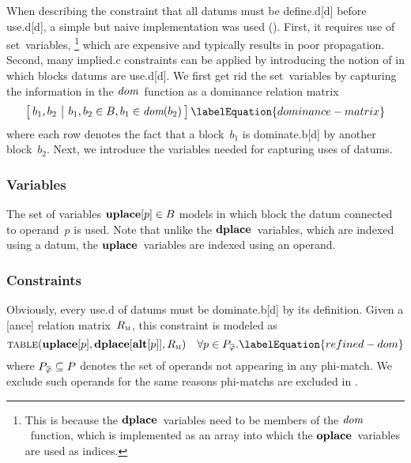 When describing the \gls{constraint} that all \glspl{datum} must be
\gls{define.d}[d] before \gls{use.d}[d], a simple but naive implementation was
used ().
%
First, it requires use of set~\glspl{variable},\!%
%
\footnote{%
  This is because the $\mVar{dplace}$~\glspl{variable} need to be members of the
  $\operatorname{\textit{dom}}$~\gls{function}, which is implemented as an array into which the
  $\mVar{oplace}$~\glspl{variable} are used as indices.%
}
%
which are expensive and typically results in poor \gls{propagation}.
%
Second, many \gls{implied.c} \glspl{constraint} can be applied by introducing
the notion of in which \glspl{block} \glspl{datum} are \gls{use.d}[d].
%
We first get rid the set~\glspl{variable} by capturing the information in the
$\operatorname{\textit{dom}}$~\gls{function} as a dominance relation matrix
%
\begin{equation}
  \begin{bmatrix}
    \begin{array}{@{\:}c|c@{\:}}
        b_1, b_2
      & b_1, b_2 \in \mBlockSet, b_1 \in \mDom(b_2)
    \end{array}
  \end{bmatrix}
  \labelEquation{dominance-matrix}
\end{equation}
%
where each row denotes the fact that a \gls{block}~$b_1$ is \gls{dominate.b}[d]
by another \gls{block}~$b_2$.
%
Next, we introduce the \glspl{variable} needed for capturing uses of
\glspl{datum}.


\subsubsection{Variables}

The set of \glspl{variable} \mbox{$\mVar{uplace}[p] \in \mBlockSet$} models in
which \gls{block} the \gls{datum} connected to \gls{operand}~$p$ is used.
%
Note that unlike the $\mVar{dplace}$~\glspl{variable}, which are indexed using a
\gls{datum}, the $\mVar{uplace}$~\glspl{variable} are indexed using an
\gls{operand}.


\subsubsection{Constraints}

Obviously, every \gls{use.d} of \glspl{datum} must be \gls{dominate.b}[d] by its
definition.
%
Given a [ance] relation matrix~$R_{\textsc{m}}$, this
\gls{constraint} is modeled as
%
\begin{equation}
  \mTable(\mVar{uplace}[p], \mVar{dplace}[\mVar{alt}[p]], \mDomMatrix)
  \mQuantSep
  \forall p \in \mPhiOperandCompSet.
  \labelEquation{refined-dom}
\end{equation}
%
where \mbox{$\mPhiOperandCompSet \subseteq \mOperandSet$} denotes the set of
\glspl{operand} not appearing in any \gls{phi-match}.
%
We exclude such \glspl{operand} for the same reasons \glspl{phi-match} are
excluded in .

